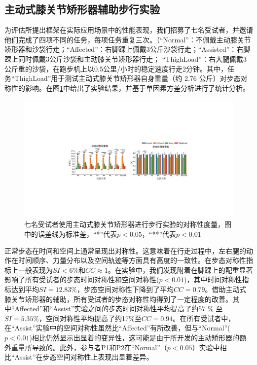 \subsection{主动式膝关节矫形器辅助步行实验}
为评估所提出框架在实际应用场景中的性能表现，我们招募了七名受试者，并邀请他们完成了四项不同的任务，每项任务重复三次。（``Normal''：不佩戴主动膝关节矫形器和沙袋行走；``Affected''：右脚踝上佩戴3公斤沙袋行走；``Assisted''：右脚踝上同时佩戴3公斤沙袋和主动膝关节矫形器行走； ``ThighLoad''：右大腿佩戴3公斤重的沙袋，在跑步机上以0.5公里/小时的稳定速度行走2分钟。其中，任务``ThighLoad''用于测试主动式膝关节矫形器自身重量（约 2.76 公斤）对步态对称性的影响。在图\ref{fig:5-7}中给出了实验结果，并基于单因素方差分析进行了统计分析。
\begin{figure}[!t]
  \centering\includegraphics[width=1\textwidth]{figures/5-Fig-7.pdf}
  \caption{七名受试者使用主动式膝关节矫形器进行步行实验的对称性度量，图中的误差线为标准差，``*''代表$p \less 0.05$，``**''代表$p \less 0.01$}
  \label{fig:5-7}
\end{figure}

正常步态在时间和空间上通常呈现出对称性。这意味着在行走过程中，左右腿的动作在时间顺序、力量分布以及空间轨迹等方面具有高度的一致性。在步态对称性指标上一般表现为${SI < 6 \%}$和${CC}\approx {1}$\cite{balabanGaitDisturbancesPatients2014}。在实验中，我们发现附着在脚踝上的配重显著影响了所有受试者的步态时间对称性和空间对称性($p<0.01$)，其中时间对称性指标达到平均${SI}=12.83 \%$，步态空间对称性下降到了平均${CC} = 0.79$。借助主动式膝关节矫形器的辅助，所有受试者的步态对称性均得到了一定程度的改善。其中``Affected''和``Assist''实验之间的步态时间对称性平均提高了约57 \% 至${SI} = 5.35 \%$，空间对称性平均提高了约17\%至${CC} = 0.94$。在所有受试者中，在``Assist''实验中的空间对称性虽然比``Affected''有所改善，但与``Normal''($p<0.01$)相比仍然显示出显着的变异性，这可能是由于所开发的主动矫形器的额外重量所导致的。此外，参与者P1和P2在``Normal''（$p<0.05$）实验中相比``Assist''在步态空间对称性上表现出显着差异。

